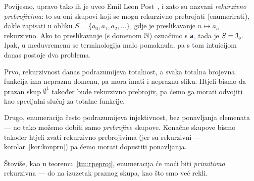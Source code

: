 Povijesno, upravo tako ih je uveo Emil Leon Post~\cite{post}, i zato su nazvani \emph{rekurzivno prebrojivima}: to su oni skupovi koji se mogu rekurzivno prebrojati (enumerirati), dakle zapisati u obliku $S=\{a_0,a_1,a_2,\dotsc\}$, gdje je preslikavanje $n\mapsto a_n$ rekurzivno. Ako to preslikavanje (s domenom ${\mathbb N}$) označimo s $\f a$, tada je $S=\im{\f a}$. Ipak, u međuvremenu se terminologija malo pomaknula, pa s tom intuicijom danas postoje dva problema.

Prvo, rekurzivnost danas podrazumijeva totalnost, a svaka totalna brojevna funkcija ima nepraznu domenu, pa mora imati i nepraznu sliku. Htjeli bismo da prazan skup $\emptyset^1$ također bude rekurzivno prebrojiv, pa ćemo ga morati odvojiti kao specijalni slučaj za totalne funkcije.

Drugo, enumeracija često podrazumijeva injektivnost, bez ponavljanja elemenata --- no tako možemo dobiti samo \emph{prebrojive} skupove. Konačne skupove bismo također htjeli zvati rekurzivno prebrojivima (jer su rekurzivni --- korolar~\ref{kor:konprn}) pa ćemo morati dopustiti ponavljanja.

Štoviše, kao u teoremu~\ref{tm:rpeproj}, enumeracija će moći biti \emph{primitivno} rekurzivna --- do na izuzetak praznog skupa, kao što smo već rekli.

